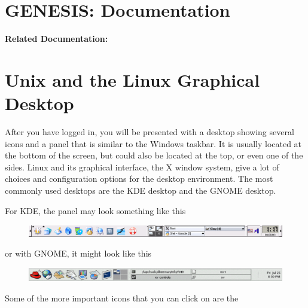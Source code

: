 \documentclass[12pt]{article}
\begin{document}
\section*{GENESIS: Documentation}

{\bf Related Documentation:}

\section*{Unix and the Linux Graphical Desktop}

After you have logged in, you will be presented with a desktop showing several icons and a panel that is similar to the Windows taskbar. It is usually located at the bottom of the screen, but could also be located at the top, or even one of the sides. Linux and its graphical interface, the X window system, give a lot of choices and configuration options for the desktop environment. The most commonly used desktops are the KDE desktop and the GNOME desktop.

For KDE, the panel may look something like this

\begin{figure}[h]
  \centering
 \includegraphics[scale=0.4]{figures/kde-gnxbar.eps}
  \label{fig:kde-gnxbar}
\end{figure}

or with GNOME, it might look like this

\begin{figure}[h]
  \centering
 \includegraphics[scale=0.4]{figures/gnomebar-term.eps}
  \label{fig:gnomegnxbar}
\end{figure}

Some of the more important icons that you can click on are the
\end{document}
